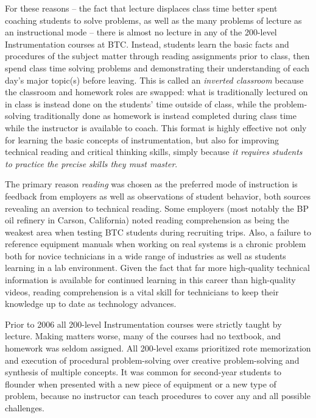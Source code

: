 \vskip 10pt

For these reasons -- the fact that lecture displaces class time better spent coaching students to solve problems, as well as the many problems of lecture as an instructional mode -- there is almost no lecture in any of the 200-level Instrumentation courses at BTC.  Instead, students learn the basic facts and procedures of the subject matter through reading assignments prior to class, then spend class time solving problems and demonstrating their understanding of each day's major topic(s) before leaving.  This is called an {\it inverted classroom} because the classroom and homework roles are swapped: what is traditionally lectured on in class is instead done on the students' time outside of class, while the problem-solving traditionally done as homework is instead completed during class time while the instructor is available to coach.  This format is highly effective not only for learning the basic concepts of instrumentation, but also for improving technical reading and critical thinking skills, simply because {\it it requires students to practice the precise skills they must master}.

The primary reason {\it reading} was chosen as the preferred mode of instruction is feedback from employers as well as observations of student behavior, both sources revealing an aversion to technical reading.  Some employers (most notably the BP oil refinery in Carson, California) noted reading comprehension as being the weakest area when testing BTC students during recruiting trips.  Also, a failure to reference equipment manuals when working on real systems is a chronic problem both for novice technicians in a wide range of industries as well as students learning in a lab environment.  Given the fact that far more high-quality technical information is available for continued learning in this career than high-quality videos, reading comprehension is a vital skill for technicians to keep their knowledge up to date as technology advances.

\vfil \eject

Prior to 2006 all 200-level Instrumentation courses were strictly taught by lecture.  Making matters worse, many of the courses had no textbook, and homework was seldom assigned.  All 200-level exams prioritized rote memorization and execution of procedural problem-solving over creative problem-solving and synthesis of multiple concepts.  It was common for second-year students to flounder when presented with a new piece of equipment or a new type of problem, because no instructor can teach procedures to cover any and all possible challenges.

